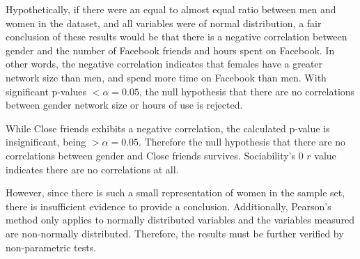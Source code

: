 \newpage
Hypothetically, if there were an equal to almost equal ratio between men and women in the dataset, and all variables were of normal distribution, a fair conclusion of these results would be that there is a negative correlation between gender and the number of Facebook friends and hours spent on Facebook. In other words, the negative correlation indicates that females have a greater network size than men, and spend more time on Facebook than men. With significant p-values $< \alpha = 0.05$, the null hypothesis that there are no correlations between gender network size or hours of use is rejected. 

While Close friends exhibits a negative correlation, the calculated p-value is insignificant, being $> \alpha = 0.05$. Therefore the null hypothesis that there are no correlations between gender and Close friends survives. Sociability's 0 $r$ value indicates there are no correlations at all.

However, since there is such a small representation of women in the sample set, there is insufficient evidence to provide a conclusion. Additionally, Pearson's method only applies to normally distributed variables and the variables measured are non-normally distributed. Therefore, the results must be further verified by non-parametric tests.

